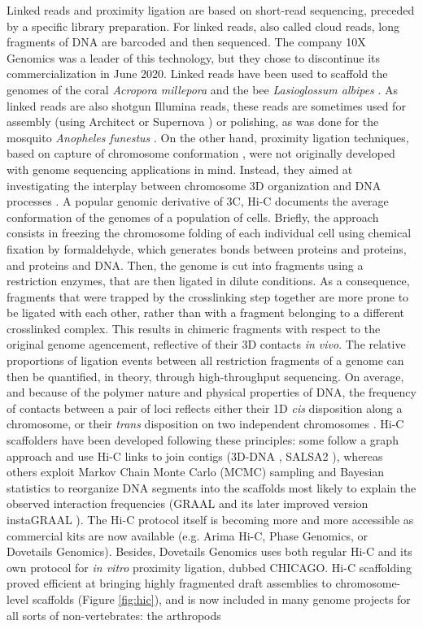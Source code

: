 Linked reads and proximity ligation are based on short-read sequencing, preceded by a specific library preparation. For linked reads, also called cloud reads, long fragments of DNA are barcoded and then sequenced. The company 10X Genomics was a leader of this technology, but they chose to discontinue its commercialization in June 2020. Linked reads have been used to scaffold the genomes of the coral \textit{Acropora millepora} \cite{acropora_millepora2} and the bee \textit{Lasioglossum albipes} \cite{lasioglossum_albipes}. As linked reads are also shotgun Illumina reads, these reads are sometimes used for assembly (using Architect \cite{architect} or Supernova \cite{supernova}) or polishing, as was done for the mosquito \textit{Anopheles funestus} \cite{anopheles_funestus}.
On the other hand, proximity ligation techniques, based on capture of chromosome conformation \cite{Dekker2002}, were not originally developed with genome sequencing applications in mind. Instead, they aimed at investigating the interplay between chromosome 3D organization and DNA processes \cite{dekker2013exploring}. A popular genomic derivative of 3C, Hi-C \cite{Lieberman-Aiden2009} documents the average conformation of the genomes of a population of cells. Briefly, the approach consists in freezing the chromosome folding of each individual cell using chemical fixation by formaldehyde, which generates bonds between proteins and proteins, and proteins and DNA. Then, the genome is cut into fragments using a restriction enzymes, that are then ligated in dilute conditions. As a consequence, fragments that were trapped by the crosslinking step together are more prone to be ligated with each other, rather than with a fragment belonging to a different crosslinked complex. This results in chimeric fragments with respect to the original genome agencement, reflective of their 3D contacts \textit{in vivo}. The relative proportions of ligation events between all restriction fragments of a genome can then be quantified, in theory, through high-throughput sequencing. On average, and because of the polymer nature and physical properties of DNA, the frequency of contacts between a pair of loci reflects either their 1D \textit{cis} disposition along a chromosome, or their \textit{trans} disposition on two independent chromosomes \cite{flot2015contact, oddes2018}. Hi-C scaffolders have been developed following these principles: some follow a graph approach and use Hi-C links to join contigs (3D-DNA \cite{3d-dna}, SALSA2 \cite{salsa2}), whereas others exploit Markov Chain Monte Carlo (MCMC) sampling and Bayesian statistics to reorganize DNA segments into the scaffolds most likely to explain the observed interaction frequencies (GRAAL \cite{graal} and its later improved version instaGRAAL \cite{instagraal}). The Hi-C protocol itself is becoming more and more accessible as commercial kits are now available (e.g. Arima Hi-C, Phase Genomics, or Dovetails Genomics). Besides, Dovetails Genomics uses both regular Hi-C and its own protocol for \textit{in vitro} proximity ligation, dubbed CHICAGO. Hi-C scaffolding proved efficient at bringing highly fragmented draft assemblies to chromosome-level scaffolds (Figure \ref{fig:hic}), and is now included in many genome projects for all sorts of non-vertebrates: the arthropods 